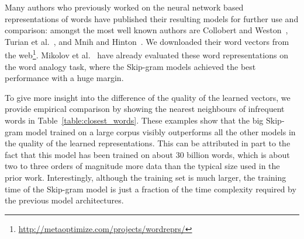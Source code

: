 \documentclass{article}
\begin{document}
Many authors who previously worked on the neural network based representations of words have published their resulting
models for further use and comparison: amongst the most well known authors
are Collobert and Weston~\cite{collobert}, Turian et al.~\cite{turian},
and Mnih and Hinton~\cite{mnih}. We downloaded their word vectors from
the web\footnote{\url{http://metaoptimize.com/projects/wordreprs/}}. 
Mikolov et al.~\cite{mikolov} have already evaluated these word representations on the word analogy task,
where the Skip-gram models achieved the best performance with a huge margin.

To give more insight into the difference of the quality of the learned
vectors, we provide empirical comparison by showing the nearest neighbours of infrequent
words in Table~\ref{table:closest_words}. These examples show that the big Skip-gram model trained on a large
corpus visibly outperforms all the other models in the quality of the learned representations.
This can be attributed in part to the fact that this model
has been trained on about 30 billion words, which is about two to three orders of magnitude more data than
the typical size used in the prior work. Interestingly, although the training set is much larger,
the training time of the Skip-gram model is just a fraction
of the time complexity required by the previous model architectures.
\end{document}
